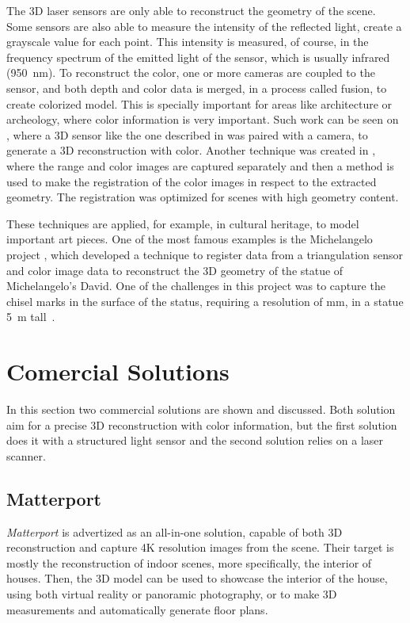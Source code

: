 The 3D laser sensors are only able to reconstruct the geometry of the scene. Some sensors are also able to measure the intensity of the reflected light, create a grayscale value for each point. This intensity is measured, of course, in the frequency spectrum of the emitted light of the sensor, which is usually infrared (\SI{950}{\nano\meter}). To reconstruct the color, one or more cameras are coupled to the sensor, and both depth and color data is merged, in a process called fusion, to create colorized model. This is specially important for areas like architecture or archeology, where color information is very important. Such work can be seen on \cite{pdias2006}, where a 3D sensor like the one described in \cite{surmann2003} was paired with a camera, to generate a 3D reconstruction with color. Another technique was created in \cite{stamus2000}, where the range and color images are captured separately and then a method is used to make the registration of the color images in respect to the extracted geometry. The registration was optimized for scenes with high geometry content.

These techniques are applied, for example, in cultural heritage, to model important art pieces. One of the most famous examples is the Michelangelo project \cite{levoy2000}, which developed a technique to register data from a triangulation sensor and color image data to reconstruct the 3D geometry of the statue of Michelangelo's David. One of the challenges in this project was to capture the chisel marks in the surface of the status, requiring a resolution of  \si{\milli\meter}, in a statue \SI{5}{\meter} tall~\cite{levoy2000}.

\section{Comercial Solutions}

In this section two commercial solutions are shown and discussed. Both solution aim for a precise 3D reconstruction with color information, but the first solution does it with a structured light sensor and the second solution relies on a laser scanner. 

\subsection{Matterport}

\emph{Matterport} is advertized as an all-in-one solution, capable of both 3D reconstruction and capture 4K resolution images from the scene. Their target is mostly the reconstruction of indoor scenes, more specifically, the interior of houses. Then, the 3D model can be used to showcase the interior of the house, using both virtual reality or panoramic photography, or to make 3D measurements and automatically generate floor plans\cite{matterport}.

